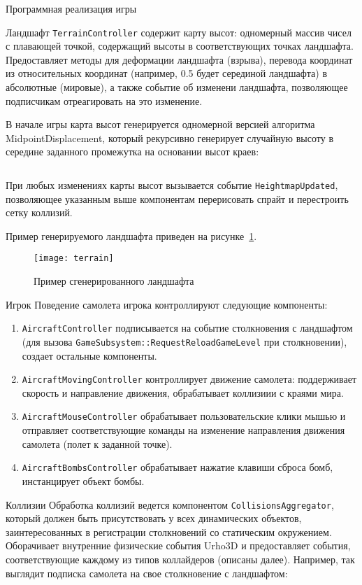 \begin{section}{Программная реализация игры}
\begin{subsection}{Ландшафт}
			\verb|TerrainController| содержит карту высот: одномерный массив чисел с плавающей точкой, содержащий высоты в соответствующих точках ландшафта.
			Предоставляет методы для деформации ландшафта (взрыва), перевода координат из относительных координат (например, 0.5 будет серединой ландшафта) в абсолютные (мировые), а также событие об изменени ландшафта, позволяющее подписчикам отреагировать на это изменение.

			В начале игры карта высот генерируется одномерной версией алгоритма MidpointDisplacement, который рекурсивно генерирует случайную высоту в середине заданного промежутка на основании высот краев:
			\clearpage
			\inputminted{cpp}{listings/MidpointDisplacement1D.cpp}

			При любых изменениях карты высот вызывается событие \verb|HeightmapUpdated|, позволяющее указанным выше компонентам перерисовать спрайт и перестроить сетку коллизий.

			Пример генерируемого ландшафта приведен на рисунке~\ref{terrain}.

			\begin{figure}[h]
				\texttt{[image: terrain]}
				\caption{Пример сгенерированного ландшафта}
				\label{terrain}
			\end{figure}
		\end{subsection}

		\begin{subsection}{Игрок}
			Поведение самолета игрока контроллируют следующие компоненты:
			\begin{enumerate}
				\item \verb|AircraftController| подписывается на событие столкновения с ландшафтом (для вызова \verb|GameSubsystem::RequestReloadGameLevel| при столкновении), создает остальные компоненты.
				\item \verb|AircraftMovingController| контроллирует движение самолета: поддерживает скорость и направление движения, обрабатывает коллизиии с краями мира.
				\item \verb|AircraftMouseController| обрабатывает пользовательские клики мышью и отправляет соответствующие команды на изменение направления движения самолета (полет к заданной точке).
				\item \verb|AircraftBombsController| обрабатывает нажатие клавиши сброса бомб, инстанцирует объект бомбы.
			\end{enumerate}
		\end{subsection}

		\clearpage
		\begin{subsection}{Коллизии}
			Обработка коллизий ведется компонентом \verb|CollisionsAggregator|, который должен быть присутствовать у всех динамических объектов, заинтересованных в регистрации столкновений со статическим окружением.
			Оборачивает внутренние физические события Urho3D и предоставляет события, соответствующие каждому из типов коллайдеров (описаны далее).
			Например, так выглядит подписка самолета на свое столкновение с ландшафтом:


\end{subsection}
\end{section}

